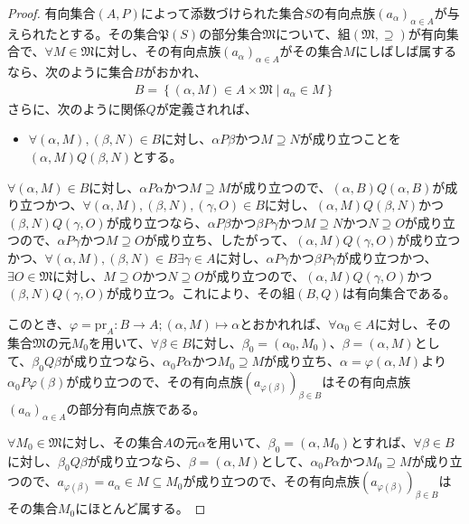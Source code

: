\documentclass[dvipdfmx]{jsarticle}
\begin{document}
\begin{proof}
有向集合$(A,P)$によって添数づけられた集合$S$の有向点族$\left( a_{\alpha} \right)_{\alpha \in A}$が与えられたとする。その集合$\mathfrak{P}(S)$の部分集合$\mathfrak{M}$について、組$\left( \mathfrak{M, \supseteq} \right)$が有向集合で、$\forall M \in \mathfrak{M}$に対し、その有向点族$\left( a_{\alpha} \right)_{\alpha \in A}$がその集合$M$にしばしば属するなら、次のように集合$B$がおかれ、
\begin{align*}
B = \left\{ (\alpha,M) \in A \times \mathfrak{M} \middle| a_{\alpha} \in M \right\}
\end{align*}
さらに、次のように関係$Q$が定義されれば、
\begin{itemize}
\item
  $\forall(\alpha,M),(\beta,N) \in B$に対し、$\alpha P\beta$かつ$M \supseteq N$が成り立つことを$(\alpha,M)Q(\beta,N)$とする。
\end{itemize}
$\forall(\alpha,M) \in B$に対し、$\alpha P\alpha$かつ$M \supseteq M$が成り立つので、$(\alpha,B)Q(\alpha,B)$が成り立つかつ、$\forall(\alpha,M),(\beta,N),(\gamma,O) \in B$に対し、$(\alpha,M)Q(\beta,N)$かつ$(\beta,N)Q(\gamma,O)$が成り立つなら、$\alpha P\beta$かつ$\beta P\gamma$かつ$M \supseteq N$かつ$N \supseteq O$が成り立つので、$\alpha P\gamma$かつ$M \supseteq O$が成り立ち、したがって、$(\alpha,M)Q(\gamma,O)$が成り立つかつ、$\forall(\alpha,M),(\beta,N) \in B\exists\gamma \in A$に対し、$\alpha P\gamma$かつ$\beta P\gamma$が成り立つかつ、$\exists O \in \mathfrak{M}$に対し、$M \supseteq O$かつ$N \supseteq O$が成り立つので、$(\alpha,M)Q(\gamma,O)$かつ$(\beta,N)Q(\gamma,O)$が成り立つ。これにより、その組$(B,Q)$は有向集合である。\par
このとき、$\varphi = {\mathrm{pr}}_{A}:B \rightarrow A;(\alpha,M) \mapsto \alpha$とおかれれば、$\forall\alpha_{0} \in A$に対し、その集合$\mathfrak{M}$の元$M_{0}$を用いて、$\forall\beta \in B$に対し、$\beta_{0} = \left( \alpha_{0},M_{0} \right)$、$\beta = (\alpha,M)$として、$\beta_{0}Q\beta$が成り立つなら、$\alpha_{0}P\alpha$かつ$M_{0} \supseteq M$が成り立ち、$\alpha = \varphi(\alpha,M)$より$\alpha_{0}P\varphi(\beta)$が成り立つので、その有向点族$\left( a_{\varphi(\beta)} \right)_{\beta \in B}$はその有向点族$\left( a_{\alpha} \right)_{\alpha \in A}$の部分有向点族である。\par
$\forall M_{0}\in \mathfrak{M}$に対し、その集合$A$の元$\alpha$を用いて、$\beta_{0} = \left( \alpha,M_{0} \right)$とすれば、$\forall\beta \in B$に対し、$\beta_{0}Q\beta$が成り立つなら、$\beta = (\alpha,M)$として、$\alpha_{0}P\alpha$かつ$M_{0} \supseteq M$が成り立つので、$a_{\varphi(\beta)} = a_{\alpha} \in M \subseteq M_{0}$が成り立つので、その有向点族$\left( a_{\varphi(\beta)} \right)_{\beta \in B}$はその集合$M_{0}$にほとんど属する。
\end{proof}
\end{document}
